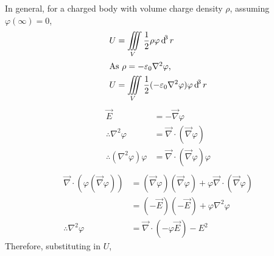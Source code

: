 \documentclass[fleqn, a4paper, 12pt, twoside]{article}
\theoremstyle{definition}
\theoremstyle{theorem}
\begin{document}
In general, for a charged body with volume charge density $\rho$, assuming $\varphi(\infty) = 0$,
\begin{align*}
	U & = \iiint\limits_{V} \dfrac{1}{2} \rho \varphi \dif^3 r \\
	\intertext{As $\rho = -\varepsilon_0 \nabla^2 \varphi$,}
	U & = \iiint\limits_{V} \dfrac{1}{2} (-\varepsilon_0 \nabla^2 \varphi) \varphi \dif^3 r
\end{align*}
\begin{align*}
	\overrightarrow{E}                                 & = -\overrightarrow{\nabla} \varphi                                                     \\
	\therefore \nabla^2 \varphi                        & = \overrightarrow{\nabla} \cdot \left( \overrightarrow{\nabla} \varphi \right)         \\
	\therefore \left( \nabla^2 \varphi \right) \varphi & = \overrightarrow{\nabla} \cdot \left( \overrightarrow{\nabla} \varphi \right) \varphi \\
\end{align*}
\begin{align*}
	\overrightarrow{\nabla} \cdot \left( \varphi \left( \overrightarrow{\nabla} \varphi \right) \right) & = \left( \overrightarrow{\nabla} \varphi \right) \left( \overrightarrow{\nabla} \varphi \right) + \varphi \overrightarrow{\nabla} \cdot \left( \overrightarrow{\nabla} \varphi \right) \\
                                                                                                            & = \left( -\overrightarrow{E} \right) \left( -\overrightarrow{E} \right) + \varphi \nabla^2 \varphi                                                                                     \\
	\therefore \nabla^2 \varphi                                                                         & = \overrightarrow{\nabla} \cdot \left( -\varphi \overrightarrow{E} \right) - E^2
\end{align*}
Therefore, substituting in $U$,
\end{document}
